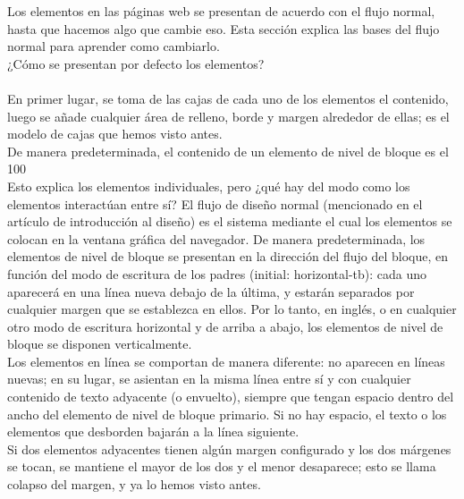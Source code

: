 Los elementos en las páginas web se presentan de acuerdo con el flujo normal, hasta que hacemos algo que cambie eso. Esta sección explica las bases del flujo normal para aprender como cambiarlo.
\\
¿Cómo se presentan por defecto los elementos?
\\\\
En primer lugar, se toma de las cajas de cada uno de los elementos el contenido, luego se añade cualquier área de relleno, borde y margen alrededor de ellas; es el modelo de cajas que hemos visto antes.
\\
De manera predeterminada, el contenido de un elemento de nivel de bloque es el 100%
\\
Esto explica los elementos individuales, pero ¿qué hay del modo como los elementos interactúan entre sí? El flujo de diseño normal (mencionado en el artículo de introducción al diseño) es el sistema mediante el cual los elementos se colocan en la ventana gráfica del navegador. De manera predeterminada, los elementos de nivel de bloque se presentan en la dirección del flujo del bloque, en función del modo de escritura de los padres (initial: horizontal-tb): cada uno aparecerá en una línea nueva debajo de la última, y estarán separados por cualquier margen que se establezca en ellos. Por lo tanto, en inglés, o en cualquier otro modo de escritura horizontal y de arriba a abajo, los elementos de nivel de bloque se disponen verticalmente.
\\
Los elementos en línea se comportan de manera diferente: no aparecen en líneas nuevas; en su lugar, se asientan en la misma línea entre sí y con cualquier contenido de texto adyacente (o envuelto), siempre que tengan espacio dentro del ancho del elemento de nivel de bloque primario. Si no hay espacio, el texto o los elementos que desborden bajarán a la línea siguiente.
\\
Si dos elementos adyacentes tienen algún margen configurado y los dos márgenes se tocan, se mantiene el mayor de los dos y el menor desaparece; esto se llama colapso del margen, y ya lo hemos visto antes.

